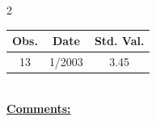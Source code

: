 
\bigskip 
\begin{multicols}{2}{ 
\begin{tabular}{ccc}
\hline  Obs.  &  Date &  Std. Val. \\ 
\hline 
                       13 &        1/2003 &          3.45 \vspace{-.12in} \\  
 \end{tabular} 
\\ 
 \columnbreak 
 \singlespacing 
 \underline{\textbf{Comments:}} \\ 
 \bigskip       

 } 
\end{multicols} 
